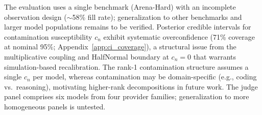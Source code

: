The evaluation uses a single benchmark (Arena-Hard) with an incomplete observation design (${\sim}$58\% fill rate); generalization to other benchmarks and larger model populations remains to be verified. Posterior credible intervals for contamination susceptibility $c_n$ exhibit systematic overconfidence (71\% coverage at nominal 95\%; Appendix~\ref{app:ci_coverage}), a structural issue from the multiplicative coupling and HalfNormal boundary at $c_n = 0$ that warrants simulation-based recalibration. The rank-1 contamination structure assumes a single $c_n$ per model, whereas contamination may be domain-specific (e.g., coding vs.\ reasoning), motivating higher-rank decompositions in future work. The judge panel comprises six models from four provider families; generalization to more homogeneous panels is untested.

